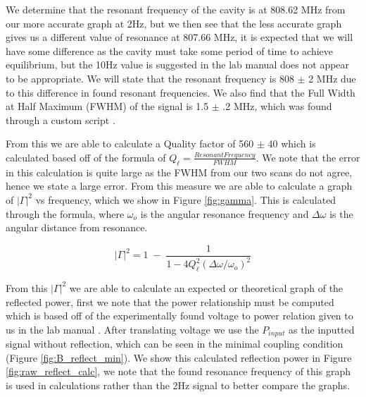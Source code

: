 We determine that the resonant frequency of the cavity is at 808.62 MHz from our more accurate graph at 2Hz, but we then see that the less accurate graph gives us a different value of resonance at 807.66 MHz, it is expected that we will have some difference as the cavity must take some period of time to achieve equilibrium, but the 10Hz value is suggested in the lab manual does not appear to be appropriate. We will state that the resonant frequency is 808 $\pm$ 2 MHz due to this difference in found resonant frequencies. We also find that the Full Width at Half Maximum (FWHM) of the signal is 1.5 $\pm$ .2 MHz, which was found through a custom script \cite{code}.

From this we are able to calculate a Quality factor of 560 $\pm$ 40 which is calculated based off of the formula of $Q_\ell = \frac{Resonant Frequency}{FWHM}$. We note that the error in this calculation is quite large as the FWHM from our two scans do not agree, hence we state a large error. From this measure we are able to calculate a graph of $|\Gamma|^2$ vs frequency, which we show in Figure \ref{fig:gamma}. This is calculated through the formula, where $\omega_o$ is the angular resonance frequency and $\Delta\omega$ is the angular distance from resonance.

\begin{equation}
    |\Gamma|^2 = 1\; -\; \frac{1}{1-4 Q_\ell^2 (\Delta\omega/\omega_o)^2}
\end{equation}

From this $|\Gamma|^2$ we are able to calculate an expected or theoretical graph of the reflected power, first we note that the power relationship must be computed which is based off of the experimentally found voltage to power relation given to us in the lab manual \cite{LabProcedure}. After translating voltage we use the $P_{input}$ as the inputted signal without reflection, which can be seen in the minimal coupling condition (Figure \ref{fig:B_reflect_min}). We show this calculated reflection power in Figure \ref{fig:raw_reflect_calc}, we note that the found resonance frequency of this graph is used in calculations rather than the 2Hz signal to better compare the graphs. 

